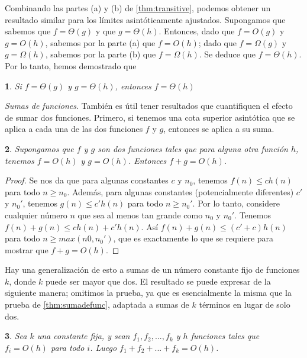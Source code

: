 \documentclass[a4paper, 12pt]{book}
\newtheorem{theorem}{}%
\begin{document}
Combinando las partes (a) y (b) de \ref{thm:transitive}, podemos obtener un resultado similar para los límites asintóticamente ajustados. Supongamos que sabemos que $f=\Theta(g)$ y que $g=\Theta(h)$. Entonces, dado que $f=O(g)$ y $g=O(h)$, sabemos por la parte (a) que $f=O(h)$; dado que $f=\Omega(g)$ y $g=\Omega(h)$, sabemos por la parte (b) que $f=\Omega(h)$. Se deduce que $f=\Theta(h)$. Por lo tanto, hemos demostrado que

\begin{theorem}
Si $f=\Theta(g)$ y $g=\Theta(h)$, entonces $f=\Theta(h)$
\end{theorem}

\textit{Sumas de funciones}. También es útil tener resultados que cuantifiquen el efecto de sumar dos funciones. Primero, si tenemos una cota superior asintótica que se aplica a cada una de las dos funciones $f$ y $g$, entonces se aplica a su suma.

\begin{theorem}
\label{thm:sumadedosfunc}
Supongamos que $f$ y $g$ son dos funciones tales que para alguna otra función $h$, tenemos $f = O(h)$ y $g = O(h)$. Entonces $f + g = O (h)$.
\end{theorem}

\begin{proof}
Se nos da que para algunas constantes $c$ y $n_0$, tenemos $f(n)≤ch(n)$ para todo $n≥n_0$. Además, para algunas constantes (potencialmente diferentes) $c'$ y $n_0'$, tenemos $g(n)≤c'h(n)$ para todo $n≥n_0'$. Por lo tanto, considere cualquier número $n$ que sea al menos tan grande como $n_0$ y $n_0'$. Tenemos $f(n) + g (n) ≤ ch (n) + c'h (n)$. Así $f (n) + g (n) ≤ (c' + c) h (n)$ para todo $n≥max(n0, n_0')$, que es exactamente lo que se requiere para mostrar que $f + g = O (h)$.
\end{proof}

Hay una generalización de esto a sumas de un número constante fijo de funciones $k$, donde $k$ puede ser mayor que dos. El resultado se puede expresar de la siguiente manera; omitimos la prueba, ya que es esencialmente la misma que la prueba de \ref{thm:sumadefunc}, adaptada a sumas de $k$ términos en lugar de solo dos.

\begin{theorem}
\label{thm:sumadekfunc}
Sea $k$ una constante fija, y sean $f_1, f_2, ..., f_k$ y $h$  funciones tales que $f_i = O(h)$ para todo $i$. Luego $f_1 + f_2 + ... + f_k = O (h)$.
\end{theorem}
\end{document}
